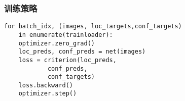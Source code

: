 \subsubsection{训练策略}
\begin{lstlisting}[caption={训练方法}]
for batch_idx, (images, loc_targets,conf_targets) 
	in enumerate(trainloader):
	optimizer.zero_grad()
	loc_preds, conf_preds = net(images)
	loss = criterion(loc_preds,
			conf_preds,
			conf_targets)
	loss.backward()
	optimizer.step()
\end{lstlisting}